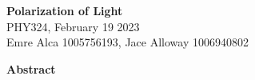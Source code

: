 \documentclass[11pt]{article}
\begin{document}
\begin{center}
    \Large {}  \textbf{Polarization of Light}\\
    \vspace{5pt} 
    \large PHY324, February 19 2023\\
    \vspace{5pt}
    Emre Alca 1005756193, Jace Alloway 1006940802
\end{center}

\nd \hrulefill

\vspace{15pt}



 \selectfont \textbf{Abstract}

 \selectfont 

\lipsum[1]\\


\nd \hrulefill

\vspace{5pt}
\end{document}
